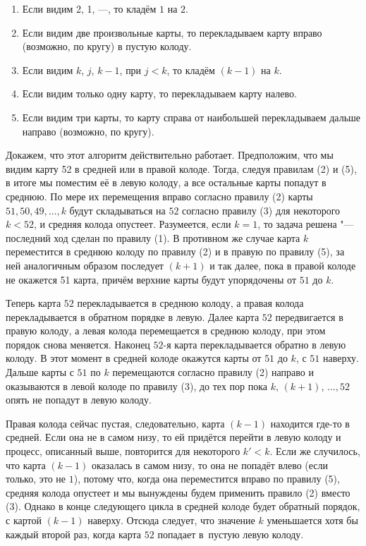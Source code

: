 \documentclass[twoside]{book}
\begin{document}
\begin{enumerate}[label=(\arabic*),noitemsep,leftmargin=\parindent,labelsep=3.5pt]
\item Если видим 2, 1, ---, то кладём $1$ на $2$.
\item Если видим две произвольные карты, то перекладываем карту вправо (возможно, по кругу) в пустую колоду.
\item Если видим $k$, $j$, $k-1$, при $j < k$, то кладём $(k-1)$ на $k$.
\item Если видим только одну карту, то перекладываем карту налево.
\item Если видим три карты, то карту справа от наибольшей перекладываем дальше направо (возможно, по кругу).
\end{enumerate}

Докажем, что этот алгоритм действительно работает.
Предположим, что мы видим карту 52 в средней или в правой колоде.
Тогда, следуя правилам (2) и (5), в итоге мы поместим её  в левую колоду, а все остальные карты попадут в среднюю.
По мере их перемещения вправо согласно правилу (2) карты $51, 50, 49, \dots, k$ будут складываться на $52$ согласно правилу (3) для некоторого $k < 52$, и средняя колода опустеет.
Разумеется, если $k = 1$, то задача решена "--- последний ход сделан по правилу (1).
В противном же случае карта $k$ переместится в среднюю колоду по правилу (2) и в правую по правилу (5), за ней аналогичным образом последует $(k+1)$ и так далее, пока в правой колоде не окажется 51 карта, причём верхние карты будут упорядочены от $51$ до $k$.

Теперь карта $52$ перекладывается в среднюю колоду,
а правая колода перекладывается в обратном порядке в левую.
Далее карта $52$ передвигается в правую колоду, а левая колода перемещается в среднюю колоду, при этом порядок снова меняется.
Наконец $52$-я карта перекладывается обратно в левую колоду.
В этот момент в средней колоде окажутся карты от $51$ до $k$, с $51$ наверху.
Дальше карты с $51$ по $k$ перемещаются согласно правилу (2) направо и оказываются в левой колоде по правилу (3), до тех пор пока $k$, $(k+1)$, $\dots, 52$ опять не попадут в левую колоду.

Правая колода сейчас пустая, следовательно,  карта $(k-1)$ находится где-то в средней.
Если она не в самом низу, то ей придётся перейти в левую колоду и процесс, описанный выше, повторится для некоторого $k'<k$.
Если же случилось, что карта $(k-1)$ оказалась в самом низу, то она не попадёт влево (если только, это не $1$), потому что, когда она переместится вправо по правилу (5), средняя колода опустеет и мы вынуждены будем применить правило (2) вместо (3).
Однако в конце следующего цикла в средней колоде будет обратный порядок, с картой $(k-1)$ наверху.
Отсюда следует, что значение $k$ уменьшается хотя бы каждый второй раз, когда карта $52$ попадает в~пустую левую колоду.
\end{document}
